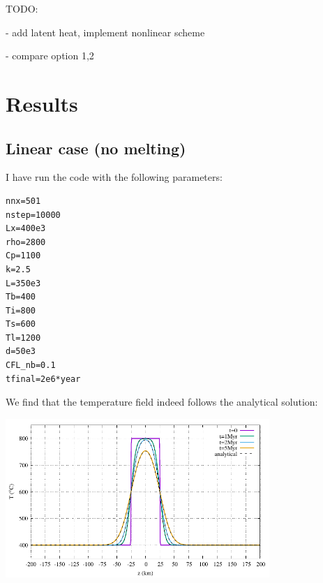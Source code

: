 TODO:

- add latent heat, implement nonlinear scheme

- compare option 1,2




\section*{Results}

\subsection*{Linear case (no melting)}

I have run the code with the following parameters:
\begin{lstlisting}
nnx=501
nstep=10000
Lx=400e3
rho=2800
Cp=1100
k=2.5
L=350e3
Tb=400
Ti=800
Ts=600
Tl=1200
d=50e3
CFL_nb=0.1
tfinal=2e6*year
\end{lstlisting}
We find that the temperature field indeed follows the analytical solution:
\begin{center}
\includegraphics[width=10cm]{python_codes/fieldstone_169/results/linear/T.pdf}
\end{center}






